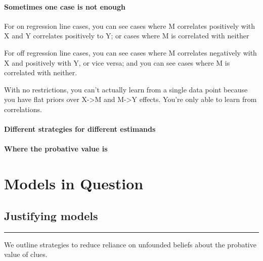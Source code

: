 \documentclass[
  12pt,
]{book}
\begin{document}
\hypertarget{sometimes-one-case-is-not-enough}{%
\subsection{Sometimes one case is not enough}\label{sometimes-one-case-is-not-enough}}

For on regression line cases, you can see cases where M correlates positively with X and Y correlates positively to Y; or cases where M is correlated with neither

For off regression line cases, you can see cases where M correlates negatively with X and positively with Y, or vice versa; and you can see cases where M is correlated with neither.

With no restrictions, you can't actually learn from a single data point because you have flat priors over X-\textgreater M and M-\textgreater Y effects. You're only able to learn from correlations.

\hypertarget{different-strategies-for-different-estimands}{%
\subsection{Different strategies for different estimands}\label{different-strategies-for-different-estimands}}

\hypertarget{where-the-probative-value-is}{%
\subsection{Where the probative value is}\label{where-the-probative-value-is}}

\hypertarget{part-models-in-question}{%
\part{Models in Question}\label{part-models-in-question}}

\hypertarget{justifying-models}{%
\chapter{Justifying models}\label{justifying-models}}

\begin{center}\rule{0.5\linewidth}{0.5pt}\end{center}

We outline strategies to reduce reliance on unfounded beliefs about the probative value of clues.
\end{document}
